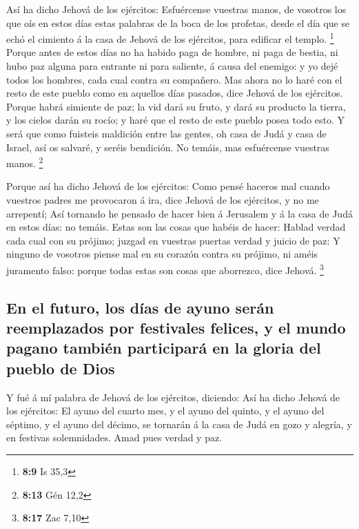  Así ha dicho Jehová de los ejércitos: Esfuércense
vuestras manos, de vosotros los que oís en estos días estas palabras de
la boca de los profetas, desde el día que se echó el cimiento á la casa
de Jehová de los ejércitos, para edificar el templo. \footnote{\textbf{8:9}
  Is 35,3}  Porque antes de estos días no ha habido paga
de hombre, ni paga de bestia, ni hubo paz alguna para entrante ni para
saliente, á causa del enemigo: y yo dejé todos los hombres, cada cual
contra su compañero.  Mas ahora no lo haré con el resto
de este pueblo como en aquellos días pasados, dice Jehová de los
ejércitos.  Porque habrá simiente de paz; la vid dará su
fruto, y dará su producto la tierra, y los cielos darán su rocío; y haré
que el resto de este pueblo posea todo esto.  Y será que
como fuisteis maldición entre las gentes, oh casa de Judá y casa de
Israel, así os salvaré, y seréis bendición. No temáis, mas esfuércense
vuestras manos. \footnote{\textbf{8:13} Gén 12,2}

 Porque así ha dicho Jehová de los ejércitos: Como pensé
haceros mal cuando vuestros padres me provocaron á ira, dice Jehová de
los ejércitos, y no me arrepentí;  Así tornando he
pensado de hacer bien á Jerusalem y á la casa de Judá en estos días: no
temáis.  Estas son las cosas que habéis de hacer: Hablad
verdad cada cual con su prójimo; juzgad en vuestras puertas verdad y
juicio de paz:  Y ninguno de vosotros piense mal en su
corazón contra su prójimo, ni améis juramento falso: porque todas estas
son cosas que aborrezco, dice Jehová. \footnote{\textbf{8:17} Zac 7,10}

\hypertarget{en-el-futuro-los-duxedas-de-ayuno-seruxe1n-reemplazados-por-festivales-felices-y-el-mundo-pagano-tambiuxe9n-participaruxe1-en-la-gloria-del-pueblo-de-dios}{%
\subsection{En el futuro, los días de ayuno serán reemplazados por
festivales felices, y el mundo pagano también participará en la gloria
del pueblo de
Dios}\label{en-el-futuro-los-duxedas-de-ayuno-seruxe1n-reemplazados-por-festivales-felices-y-el-mundo-pagano-tambiuxe9n-participaruxe1-en-la-gloria-del-pueblo-de-dios}}

 Y fué á mí palabra de Jehová de los ejércitos, diciendo:
 Así ha dicho Jehová de los ejércitos: El ayuno del
cuarto mes, y el ayuno del quinto, y el ayuno del séptimo, y el ayuno
del décimo, se tornarán á la casa de Judá en gozo y alegría, y en
festivas solemnidades. Amad pues verdad y paz.

